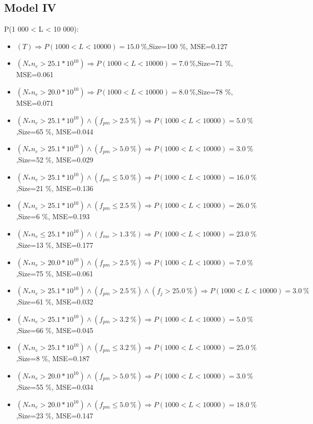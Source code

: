 \documentclass[numbered]{CSL}
\begin{document}
\subsection{Model IV}
P(1 000 < L < 10 000):
\begin{itemize}
\item $(T) \Rightarrow P(1 000 < L < 10 000) = 15.0~\%$,\hfill Size=100 \%, MSE=0.127
\item $(N_* n_e > 25.1 * 10^{10}) \Rightarrow P(1 000 < L < 10 000) = 7.0~\%$,\hfill Size=71 \%, MSE=0.061
\item $(N_* n_e > 20.0 * 10^{10}) \Rightarrow P(1 000 < L < 10 000) = 8.0~\%$,\hfill Size=78 \%, MSE=0.071
\item $(N_* n_e > 25.1 * 10^{10}) \land (f_{pm} > 2.5~\%) \Rightarrow P(1 000 < L < 10 000) = 5.0~\%$,\hfill Size=65 \%, MSE=0.044
\item $(N_* n_e > 25.1 * 10^{10}) \land (f_{pm} > 5.0~\%) \Rightarrow P(1 000 < L < 10 000) = 3.0~\%$,\hfill Size=52 \%, MSE=0.029
\item $(N_* n_e > 25.1 * 10^{10}) \land (f_{pm} \leq 5.0~\%) \Rightarrow P(1 000 < L < 10 000) = 16.0~\%$,\hfill Size=21 \%, MSE=0.136
\item $(N_* n_e > 25.1 * 10^{10}) \land (f_{pm} \leq 2.5~\%) \Rightarrow P(1 000 < L < 10 000) = 26.0~\%$,\hfill Size=6 \%, MSE=0.193
\item $(N_* n_e \leq 25.1 * 10^{10}) \land (f_{me} > 1.3~\%) \Rightarrow P(1 000 < L < 10 000) = 23.0~\%$,\hfill Size=13 \%, MSE=0.177
\item $(N_* n_e > 20.0 * 10^{10}) \land (f_{pm} > 2.5~\%) \Rightarrow P(1 000 < L < 10 000) = 7.0~\%$,\hfill Size=75 \%, MSE=0.061
\item $(N_* n_e > 25.1 * 10^{10}) \land (f_{pm} > 2.5~\%) \land (f_j > 25.0~\%) \Rightarrow P(1 000 < L < 10 000) = 3.0~\%$,\hfill Size=61 \%, MSE=0.032
\item $(N_* n_e > 25.1 * 10^{10}) \land (f_{pm} > 3.2~\%) \Rightarrow P(1 000 < L < 10 000) = 5.0~\%$,\hfill Size=66 \%, MSE=0.045
\item $(N_* n_e > 25.1 * 10^{10}) \land (f_{pm} \leq 3.2~\%) \Rightarrow P(1 000 < L < 10 000) = 25.0~\%$,\hfill Size=8 \%, MSE=0.187
\item $(N_* n_e > 20.0 * 10^{10}) \land (f_{pm} > 5.0~\%) \Rightarrow P(1 000 < L < 10 000) = 3.0~\%$,\hfill Size=55 \%, MSE=0.034
\item $(N_* n_e > 20.0 * 10^{10}) \land (f_{pm} \leq 5.0~\%) \Rightarrow P(1 000 < L < 10 000) = 18.0~\%$,\hfill Size=23 \%, MSE=0.147

\end{itemize}
\end{document}

